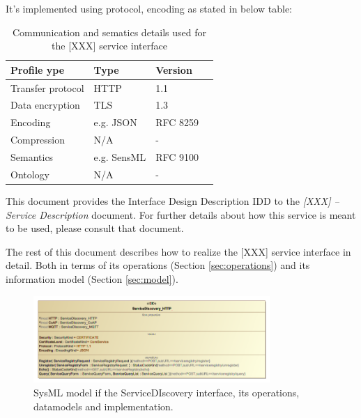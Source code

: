 \documentclass[a4paper]{arrowhead}
\begin{document}
\color{red}
It's implemented using protocol, encoding as stated in below table:
\begin{table}[ht!]
  \centering
  \begin{tabular}{|l|l|l|l|}
    \hline
    \rowcolor{gray!33} Profile ype & Type & Version \\ \hline
    Transfer protocol & HTTP & 1.1 \\ \hline
    Data encryption & TLS & 1.3 \\ \hline
    Encoding & e.g. JSON & RFC 8259 \cite{rfc8259} \\ \hline
    Compression & N/A & - \\ \hline
    Semantics & e.g. SensML & RFC 9100 \cite{rfc9100} \\ \hline
    Ontology & N/A & - \\ \hline
  \end{tabular}
  \caption{Communication and sematics details used for the [XXX]
    service interface}
  \label{tab:comunication_semantics_profile}
\end{table}
\color{black}

This document provides the Interface Design Description IDD to the \textit{[XXX] -- Service Description} document.
For further details about how this service is meant to be used, please consult that document.

The rest of this document describes how to realize the [XXX] service
interface in detail. Both in terms of its operations (Section \ref{sec:operations}) and its information model (Section \ref{sec:model}).



\newpage

\begin{figure}[ht!]
  \centering
  \includegraphics[width=0.8\textwidth]{figures/ServiceDiscovery-IDD}
  \caption{SysML model if the ServiceDIscovery interface, its
    operations, datamodels and implementation.}
  \label{fig:ServiceDiscovery-IDD}
\end{figure}
\end{document}
